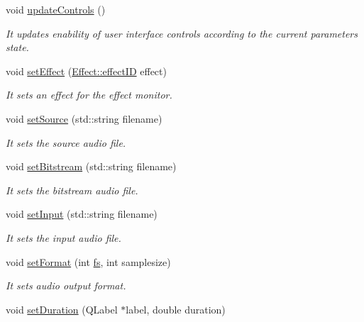 \begin{DoxyCompactItemize}
\mbox{\label{class_s_a_c_effects_aab4eb7a1cfb54e995a43967843e0c4b7}} 
void \hyperlink{class_s_a_c_effects_aab4eb7a1cfb54e995a43967843e0c4b7}{update\+Controls} ()
\begin{DoxyCompactList}\small\item\em It updates enability of user interface controls according to the current parameters state. \end{DoxyCompactList}\item 
void \hyperlink{class_s_a_c_effects_ab57fa3b5c11bafba4c2e471a80964c14}{set\+Effect} (\hyperlink{class_effect_a6422fe21e9e452943fbc3344884a6fed}{Effect\+::effect\+ID} effect)
\begin{DoxyCompactList}\small\item\em It sets an effect for the effect monitor. \end{DoxyCompactList}\item 
void \hyperlink{class_s_a_c_effects_aaa9092eb132a8fe2b0560b3a600747b5}{set\+Source} (std\+::string filename)
\begin{DoxyCompactList}\small\item\em It sets the source audio file. \end{DoxyCompactList}\item 
void \hyperlink{class_s_a_c_effects_a4ff113bcbd922362d8fcb9ef61d3641b}{set\+Bitstream} (std\+::string filename)
\begin{DoxyCompactList}\small\item\em It sets the bitstream audio file. \end{DoxyCompactList}\item 
void \hyperlink{class_s_a_c_effects_a5292df44aee2a4ec49c99e3136b5472e}{set\+Input} (std\+::string filename)
\begin{DoxyCompactList}\small\item\em It sets the input audio file. \end{DoxyCompactList}\item 
void \hyperlink{class_s_a_c_effects_a3d06db323bc9a3a1bbfe810f2a30d10f}{set\+Format} (int \hyperlink{class_s_a_c_effects_af9b20759f91e969aaa55f47f5aeecb37}{fs}, int samplesize)
\begin{DoxyCompactList}\small\item\em It sets audio output format. \end{DoxyCompactList}\item 
void \hyperlink{class_s_a_c_effects_a69e964cefe25c40e7852cf7baeda28fd}{set\+Duration} (Q\+Label $\ast$label, double duration)

\end{DoxyCompactItemize}
